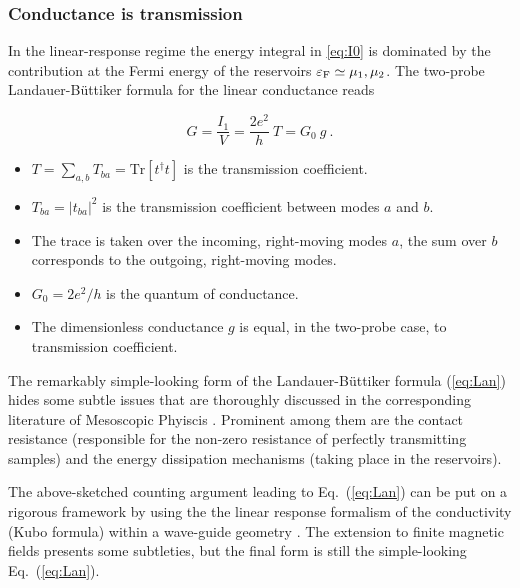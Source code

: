 \documentclass[a4paper,10pt]{article}
\newcommand{\nin}{\noindent}
\begin{document}
\subsubsection{Conductance is transmission}
\label{subsub:cit}

In the linear-response regime the energy integral in \eqref{eq:I0} is dominated by the contribution at the Fermi energy of the reservoirs 
$\varepsilon_{\rm F} \simeq \mu_1,\mu_2$. The two-probe Landauer-B\"uttiker formula for the linear conductance reads
  
\begin{equation}
\label{eq:Lan}
G = \frac{{I}_1}{V} = \frac{2 e^2}{h} \ T = G_0 \ g \ .
\end{equation}  

\begin{itemize}

\item $T = \sum_{a,b}T_{ba} = \mathrm{Tr}[t^\dagger t]$ is the transmission coefficient. 

\item  $T_{ba} = |t_{ba}|^2$  is the transmission coefficient between modes $a$ and $b$.

\item The trace is taken over the incoming, right-moving modes $a$, the sum over $b$ corresponds to the outgoing, right-moving modes. 

\item $G_0 = 2 e^2/h$ is the quantum of conductance.

\item The dimensionless conductance $g$ is equal, in the two-probe case, to transmission coefficient.

\end{itemize}

\nin The remarkably simple-looking form of the Landauer-B\"uttiker formula
(\ref{eq:Lan}) hides some subtle issues that are thoroughly discussed in the corresponding literature of Mesoscopic Phyiscis \cite{Imry86}. Prominent among them are the contact resistance (responsible for the non-zero resistance of perfectly transmitting samples) and the energy dissipation mechanisms (taking place in the reservoirs).  

\nin The above-sketched counting argument leading to Eq.~(\ref{eq:Lan}) can be put on a rigorous framework by using the the linear response formalism of the conductivity (Kubo formula) within a wave-guide geometry \cite{FishLee,Szafer}. The extension to finite
magnetic fields \cite{BarSto89b,Shepard,NSB}
presents some subtleties, but the final form is 
still the simple-looking Eq.~(\ref{eq:Lan}).
\end{document}
